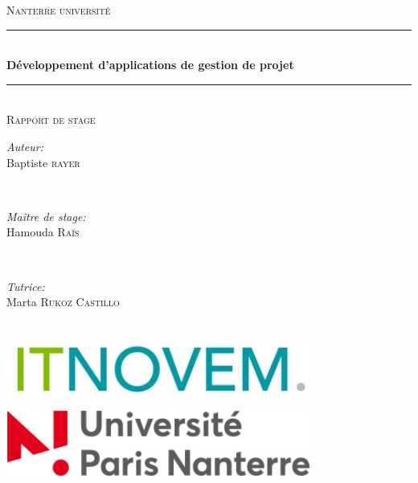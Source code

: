 \documentclass[12pt, twoside, openright]{report}
\begin{document}
\begin{titlepage}

\newcommand{\HRule}{\rule{\linewidth}{0.5mm}} 
\center
 

\textsc{\LARGE Nanterre université}\\[1.5cm]
\HRule \\[0.4cm]
{ \huge \bfseries Développement d'applications de gestion de projet }\\[0.4cm]
\HRule \\[1.5cm]
 \textsc{\Large Rapport de stage }\\[0.5cm]

\begin{minipage}{0.4\textwidth}
\begin{center} \large
\emph{Auteur:}\\
Baptiste \textsc{rayer} 
\end{center}
\end{minipage}\\[0.5cm]

\begin{minipage}{0.4\textwidth}
\begin{center} \large
\emph{Maître de stage:}\\
 Hamouda \textsc{Raïs} 
\end{center}
\end{minipage}
~
\begin{minipage}{0.4\textwidth}
\begin{center} \large
\emph{Tutrice:} \\
Marta \textsc{Rukoz Castillo}
\end{center}
\end{minipage}\\[4cm]


\includegraphics[width=10cm,height=2.25cm]{img/itnovem2.png}
\includegraphics[width=10cm,height=2.25cm]{img/UPN.jpg}

\vfill 

\end{titlepage}
\end{document}
